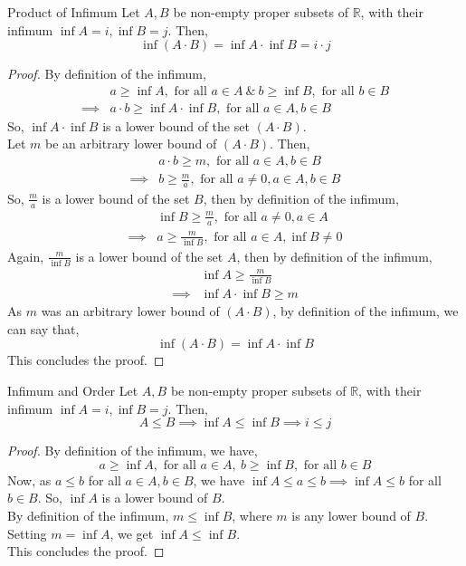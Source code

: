 \begin{Theorem}{Product of Infimum}\label{product_infimum}
    Let $A, B$ be non-empty proper subsets of $\mathbb{R}$, with their infimum $\inf A = i,\inf B=j$. Then, $$\inf (A\cdot B)=\inf A\cdot\inf B=i\cdot j$$
\end{Theorem}
\begin{proof}
    By definition of the infimum,
    \begin{align*}
        & a\geq\inf A,\text{ for all }a\in A\ \&\ b\geq\inf B,\text{ for all }b\in B\\
        \implies &a\cdot b\geq\inf A\cdot\inf B,\text{ for all }a\in A, b\in B
    \end{align*}
    So, $\inf A\cdot\inf B$ is a lower bound of the set $(A\cdot B)$.\\
    Let $m$ be an arbitrary lower bound of $(A\cdot B)$. Then,
    \begin{align*}
        &a\cdot b\geq m,\text{ for all }a\in A,b\in B\\
        \implies&b\geq \frac{m}{a},\text{ for all }a\neq 0,a\in A,b\in B
    \end{align*}
    So, $\frac{m}{a}$ is a lower bound of the set $B$, then by definition of the infimum,
    \begin{align*}
        &\inf B\geq \frac{m}{a},\text{ for all }a\neq0,a\in A\\
        \implies&a\geq \frac{m}{\inf B},\text{ for all }a\in A,\inf B\neq 0
    \end{align*}
    Again, $\frac{m}{\inf B}$ is a lower bound of the set $A$, then by definition of the infimum,
    \begin{align*}
        &\inf A\geq \frac{m}{\inf B}\\
        \implies&\inf A\cdot\inf B\geq m
    \end{align*}
    As $m$ was an arbitrary lower bound of $(A\cdot B)$, by definition of the infimum, we can say that, $$\inf(A\cdot B)=\inf A\cdot \inf B$$ This concludes the proof.
\end{proof}

\begin{Theorem}{Infimum and Order}\label{infimum_order}
    Let $A, B$ be non-empty proper subsets of $\mathbb{R}$, with their infimum $\inf A = i,\inf B=j$. Then, $$A\leq B\implies\inf A\leq\inf B\implies i\leq j$$
\end{Theorem}
\begin{proof}
    By definition of the infimum, we have,
    $$a\geq\inf A,\text{ for all }a\in A,\ b\geq\inf B,\text{ for all }b\in B$$
    Now, as $a\leq b$ for all $a\in A, b\in B$, we have $\inf A\leq a\leq b\implies \inf A\leq b$ for all $b\in B$. So, $\inf A$ is a lower bound of $B$.\\
    By definition of the infimum, $m\leq\inf B$, where $m$ is any lower bound of $B$. Setting $m=\inf A$, we get $\inf A\leq \inf B$.\\
    This concludes the proof.
\end{proof}
